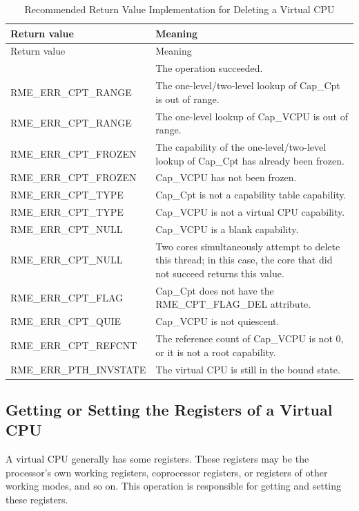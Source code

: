 \begin{xltabular}{\textwidth}{@{}>{\hsize\raggedright\arraybackslash}X>{\hsize\raggedright\arraybackslash}X@{}}
\caption{Recommended Return Value Implementation for Deleting a Virtual CPU}\label{tab:8-88-delete-virtual-cpu-suggested-return-values}\\
\toprule
Return value & Meaning\tabularnewline
\endfirsthead
\toprule
Return value & Meaning\tabularnewline
\midrule
\endhead
\bottomrule
{} & The operation succeeded.\tabularnewline
    RME\_ERR\_CPT\_RANGE & The one-level/two-level lookup of Cap\_Cpt is out of range.\tabularnewline
    RME\_ERR\_CPT\_RANGE & The one-level lookup of Cap\_VCPU is out of range.\tabularnewline
    RME\_ERR\_CPT\_FROZEN & The capability of the one-level/two-level lookup of Cap\_Cpt has already been frozen.\tabularnewline
    RME\_ERR\_CPT\_FROZEN & Cap\_VCPU has not been frozen.\tabularnewline
    RME\_ERR\_CPT\_TYPE & Cap\_Cpt is not a capability table capability.\tabularnewline
    RME\_ERR\_CPT\_TYPE & Cap\_VCPU is not a virtual CPU capability.\tabularnewline
    RME\_ERR\_CPT\_NULL & Cap\_VCPU is a blank capability.\tabularnewline
    RME\_ERR\_CPT\_NULL & Two cores simultaneously attempt to delete this thread; in this case, the core that did not succeed returns this value.\tabularnewline
    RME\_ERR\_CPT\_FLAG & Cap\_Cpt does not have the RME\_CPT\_FLAG\_DEL attribute.\tabularnewline
    RME\_ERR\_CPT\_QUIE & Cap\_VCPU is not quiescent.\tabularnewline
    RME\_ERR\_CPT\_REFCNT & The reference count of Cap\_VCPU is not 0, or it is not a root capability.\tabularnewline
    RME\_ERR\_PTH\_INVSTATE & The virtual CPU is still in the bound state.\tabularnewline
\end{xltabular}
\nopagebreak[4]

\subsection{Getting or Setting the Registers of a Virtual CPU}\label{subsec:8-get-or-set-virtual-cpu-registers}

A virtual CPU generally has some registers. These registers may be the processor's own working registers, coprocessor registers, or registers of other working modes, and so on. This operation is responsible for getting and setting these registers.

